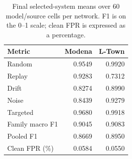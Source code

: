 \begin{table}[tbp]
\centering\small
\caption[Final ten-seed results on both networks]{Final selected-system means over 60 model/source cells per network. F1 is on the 0--1 scale; clean FPR is expressed as a percentage.}
\label{tab:finalmeans}
\begin{tabular}{@{}lrr@{}}
\toprule
Metric & Modena & L-Town\\
\midrule
Random & 0.9549 & 0.9920\\
Replay & 0.9283 & 0.7312\\
Drift & 0.8274 & 0.8990\\
Noise & 0.8439 & 0.9279\\
Targeted & 0.9680 & 0.9918\\
Family macro F1 & 0.9045 & 0.9083\\
Pooled F1 & 0.8669 & 0.8950\\
Clean FPR (\%) & 0.0584 & 0.0550\\
\bottomrule
\end{tabular}
\end{table}
